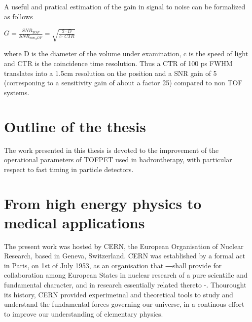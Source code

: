 A useful and pratical estimation of the gain in signal to noise can be formalized as follows

$G = \frac{SNR_{TOF}}{SNR_{non_TOF}} = \sqrt{\frac{2\cdot D}{c \cdot CTR}}$

where D is the diameter of the volume under examination, c is the speed of light and CTR is the coincidence time resolution. Thus a CTR of 100 ps FWHM translates into a 1.5cm resolution on the position and a SNR gain of 5 (corresponing to a sensitivity gain of about a factor 25) compared to non TOF systems.

\section{Outline of the thesis}
The work presented in this thesis is devoted to the improvement of the operational parameters of TOFPET used in hadrontherapy, with particular respect to fast timing in particle detectors.
\section{From high energy physics to medical applications}


The present work was hosted by CERN, the European Organisation of Nuclear Research, based in Geneva, Switzerland. 
CERN was established by a formal act in Paris, on 1st of July 1953, as an organisation that ―shall provide for collaboration among European States in nuclear research of a pure scientific and fundamental character, and in research essentially related thereto -.
Thourought its history, CERN provided experimetnal and theoretical tools to study and understand the fundamental forces governing our universe, in a continous effort to improve our understanding of elementary  physics. 

